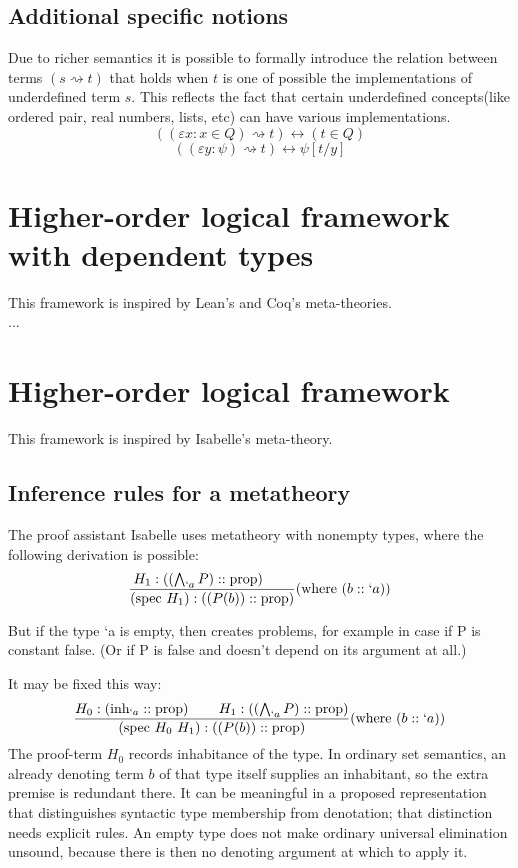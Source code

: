 \subsection{Additional specific notions}
Due to richer semantics it is possible to formally introduce the relation between terms $(s \rightsquigarrow t)$ that holds when $t$ is one of possible the implementations of underdefined term $s$. This reflects the fact that certain underdefined concepts(like ordered pair, real numbers, lists, etc) can have various implementations.
\[
((\varepsilon x:x\in Q)\rightsquigarrow t) \longleftrightarrow (t\in Q)
\]
\[
((\varepsilon y:\psi)\rightsquigarrow t) \longleftrightarrow \psi[t/y]
\]

\section{Higher-order logical framework with dependent types}
This framework is inspired by Lean's and Coq's meta-theories.\\
...
\pagebreak
\section{Higher-order logical framework}
This framework is inspired by Isabelle's meta-theory.\\

\subsection{Inference rules for a metatheory}
The proof assistant Isabelle uses metatheory with nonempty types, where the following derivation is possible:
\[
\frac{
H_1:\left(\left(\bigwedge_{`a}P\right)::\mathrm{prop}\right)
\quad\quad
}{
(\text{spec}\ H_1): \left(\left(P(b)\right)::\mathrm{prop}\right)
}(\mbox{where }(b::`a))
\]

But if the type `a is empty, then creates problems, for example in case if P is constant false. (Or if P is false and doesn't depend on its argument at all.)

It may be fixed this way:\\
\[
\frac{
H_0: \left(\text{inh}_{`a}::\mathrm{prop}\right)
\quad\quad
H_1:\left(\left(\bigwedge_{`a}P\right)::\mathrm{prop}\right)
}{
(\text{spec}\ H_0\ H_1): \left(\left(P(b)\right)::\mathrm{prop}\right)
}(\mbox{where }(b::`a))
\]
The proof-term $H_0$ records inhabitance of the type. In ordinary set
semantics, an already denoting term $b$ of that type itself supplies an
inhabitant, so the extra premise is redundant there. It can be meaningful
in a proposed representation that distinguishes syntactic type membership
from denotation; that distinction needs explicit rules. An empty type
does not make ordinary universal elimination unsound, because there is
then no denoting argument at which to apply it.


